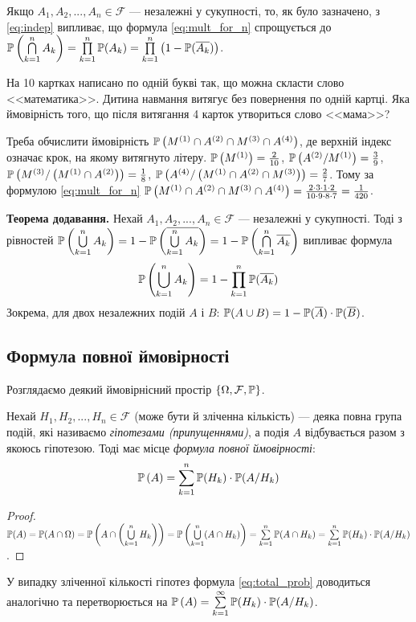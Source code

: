 Якщо $A_1, A_2, ..., A_n \in \mathcal{F}$ --- незалежні у сукупності, то, як було зазначено, з \eqref{eq:indep} випливає, що
формула \eqref{eq:mult_for_n} спрощується до $\P\left(\bigcap\limits_{k=1}^n A_k\right) = \prod\limits_{k=1}^n \P(A_k) = \prod\limits_{k=1}^n \left(1-\P(\overline{A_k})\right)$.

\begin{example}
    На 10 картках написано по одній букві так, що можна скласти слово <<математика>>.
    Дитина навмання витягує без повернення по одній картці. Яка ймовірність того, що після витягання 4 карток
    утвориться слово <<мама>>?

    Треба обчислити ймовірність $\P\left(M^{(1)} \cap A^{(2)} \cap M^{(3)} \cap A^{(4)}\right)$,
    де верхній індекс означає крок, на якому витягнуто літеру.
    $\P\left(M^{(1)}\right) = \frac{2}{10}$, $\P\left(A^{(2)} / M^{(1)}\right) = \frac{3}{9}$,
    $\P\left(M^{(3)}/\left(M^{(1)} \cap A^{(2)}\right)\right) = \frac{1}{8}$, $\P\left(A^{(4)} / \left(M^{(1)} \cap A^{(2)} \cap M^{(3)}\right)\right) = \frac{2}{7}$.
    Тому за формулою \eqref{eq:mult_for_n} $\P\left(M^{(1)} \cap A^{(2)} \cap M^{(3)} \cap A^{(4)}\right) = \frac{2 \cdot 3 \cdot 1 \cdot 2}{10 \cdot 9 \cdot 8 \cdot 7} = \frac{1}{420}$.
\end{example}

\noindent\textbf{Теорема додавання.} Нехай $A_1, A_2, ..., A_n \in \mathcal{F}$ --- незалежні у сукупності.
Тоді з рівностей $\P\left(\bigcup\limits_{k=1}^n A_k\right) = 1 - \P\left(\overline{\bigcup\limits_{k=1}^n A_k}\right) = 1 - \P\left(\bigcap\limits_{k=1}^n \overline{A_k}\right)$
випливає формула
\begin{equation}
    \P\left(\bigcup\limits_{k=1}^n A_k\right) = 1 - \prod\limits_{k=1}^n \P(\overline{A_k})
\end{equation}
Зокрема, для двох незалежних подій $A$ і $B$: $\P(A\cup B) = 1 - \P(\overline{A}) \cdot \P(\overline{B})$.

\subsection{Формула повної ймовірності}
Розглядаємо деякий ймовірнісний простір $\left\{ \Omega, \mathcal{F}, \P\right\}$.

Нехай $H_1, H_2, ..., H_n \in \mathcal{F}$ (може бути й зліченна кількість) --- деяка повна група подій,
які називаємо \emph{гіпотезами (припущеннями)}, а подія $A$ відбувається разом з якоюсь гіпотезою. Тоді має місце
\emph{формула повної ймовірності}:
\begin{equation}\label{eq:total_prob}
    \P\left( A \right) = \sum\limits_{k=1}^n \P(H_k)\cdot \P(A/H_k)
\end{equation}
\begin{proof}
    $\P(A) = \P(A \cap \Omega) = \P\left(A \cap \left(\bigcup\limits_{k=1}^n H_k\right)\right) = \P\left(\bigcup\limits_{k=1}^n (A\cap H_k)\right) = \sum\limits_{k=1}^n \P(A\cap H_k) = \sum\limits_{k=1}^n \P(H_k)\cdot \P(A/H_k)$.
\end{proof}
У випадку зліченної кількості гіпотез формула \eqref{eq:total_prob} доводиться аналогічно та перетворюється
на $\P\left( A \right) = \sum\limits_{k=1}^{\infty} \P(H_k)\cdot \P(A/H_k)$.

